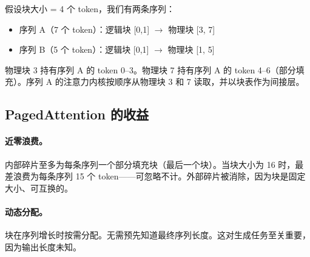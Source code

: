 \begin{examplebox}[块表示例]
假设块大小 = 4 个 token，我们有两条序列：

\begin{itemize}
  \item 序列 A（7 个 token）：逻辑块 [0,1] $\to$ 物理块 [3, 7]
  \item 序列 B（5 个 token）：逻辑块 [0,1] $\to$ 物理块 [1, 5]
\end{itemize}

物理块 3 持有序列 A 的 token 0--3。物理块 7 持有序列 A 的 token 4--6（部分填充）。序列 A 的注意力内核按顺序从物理块 3 和 7 读取，并以块表作为间接层。
\end{examplebox}

\subsection{PagedAttention 的收益}
\label{benefits-of-pagedattention}

\paragraph{近零浪费。}
\label{near-zero-waste.}

内部碎片至多为每条序列一个部分填充块（最后一个块）。当块大小为 16 时，最差浪费为每条序列 15 个 token——可忽略不计。外部碎片被消除，因为块是固定大小、可互换的。

\paragraph{动态分配。}
\label{dynamic-allocation.}

块在序列增长时按需分配。无需预先知道最终序列长度。这对生成任务至关重要，因为输出长度未知。


